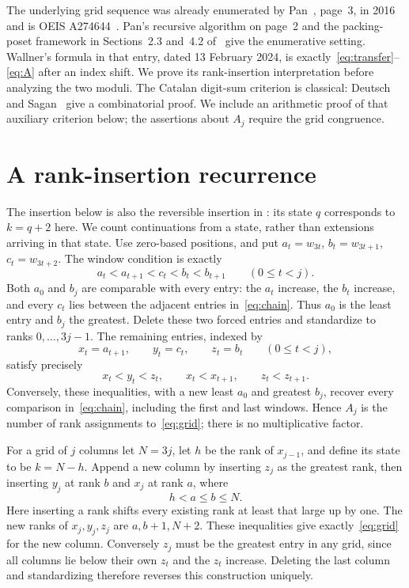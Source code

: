 \documentclass[11pt]{article}
\begin{document}
The underlying grid sequence was already enumerated by Pan~\cite{Pan},
page~3, in 2016 and is OEIS A274644~\cite{OEIS}. Pan's recursive algorithm on page~2
and the packing-poset framework in Sections~2.3 and~4.2 of~\cite{BKS}
give the enumerative setting. Wallner's formula in that entry, dated
13 February 2024, is exactly~\eqref{eq:transfer}--\eqref{eq:A} after
an index shift. We prove its rank-insertion interpretation before
analyzing the two moduli. The Catalan digit-sum criterion
is classical: Deutsch and Sagan~\cite[Theorem~2.1]{DS} give a
combinatorial proof. We include an arithmetic proof of that auxiliary
criterion below; the assertions about $A_j$ require the grid congruence.

\section{A rank-insertion recurrence}
The insertion below is also the reversible insertion in
\cite[Lemma~9.3, equation~(9.11)]{BKSII}: its state $q$ corresponds
to $k=q+2$ here. We count continuations from a state, rather than
extensions arriving in that state.
Use zero-based positions, and put $a_t=w_{3t}$, $b_t=w_{3t+1}$,
$c_t=w_{3t+2}$. The window condition is exactly
\begin{equation}\label{eq:chain}
 a_t<a_{t+1}<c_t<b_t<b_{t+1}\qquad(0\leq t<j).
\end{equation}
Both $a_0$ and $b_j$ are comparable with every entry: the $a_t$ increase,
the $b_t$ increase, and every $c_t$ lies between the adjacent entries
in~\eqref{eq:chain}. Thus $a_0$ is the least entry and $b_j$ the greatest.
Delete these two forced entries and standardize to ranks $0,\ldots,3j-1$.
The remaining entries, indexed by
\[
 x_t=a_{t+1},\qquad y_t=c_t,\qquad z_t=b_t\qquad(0\leq t<j),
\]
satisfy precisely
\begin{equation}\label{eq:grid}
 x_t<y_t<z_t,\qquad x_t<x_{t+1},\qquad z_t<z_{t+1}.
\end{equation}
Conversely, these inequalities, with a new least $a_0$ and greatest
$b_j$, recover every comparison in~\eqref{eq:chain}, including the
first and last windows. Hence $A_j$ is the number of rank assignments
to~\eqref{eq:grid}; there is no multiplicative factor.

For a grid of $j$ columns let $N=3j$, let $h$ be the rank of $x_{j-1}$,
and define its state to be $k=N-h$. Append a new column by inserting
$z_j$ as the greatest rank, then inserting $y_j$ at rank $b$ and $x_j$
at rank $a$, where
\begin{equation}\label{eq:insert}
 h<a\leq b\leq N.
\end{equation}
Here inserting a rank shifts every existing rank at least that large
up by one. The new ranks of $x_j,y_j,z_j$ are $a,b+1,N+2$.
These inequalities give exactly~\eqref{eq:grid} for the new column.
Conversely $z_j$ must be the greatest entry in any grid, since all
columns lie below their own $z_t$ and the $z_t$ increase.
Deleting the last column and standardizing therefore reverses this
construction uniquely.
\end{document}
